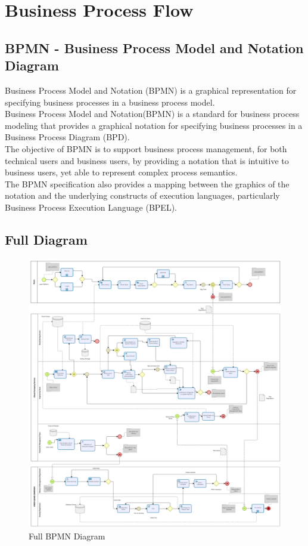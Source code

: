 \documentclass[a4paper,12pt]{report}
\begin{document}
\chapter{Business Process Flow}
\section{BPMN - Business Process Model and Notation Diagram }
Business Process Model and Notation (BPMN) is a graphical representation for specifying business processes in a business process model.\\
Business Process Model and Notation(BPMN) is a standard for business process modeling that provides a graphical notation for specifying business processes in a Business Process Diagram (BPD).\\
The objective of BPMN is to support business process management, for both technical users and business users, by providing a notation that is intuitive to business users, yet able to represent complex process semantics.\\
The BPMN specification also provides a mapping between the graphics of the notation and the underlying constructs of execution languages, particularly Business Process Execution Language (BPEL).
\section{Full Diagram}
\begin{figure}[H]
 \centering
\includegraphics[scale=0.15]{Full_BPMN}
\caption{Full BPMN Diagram}
\label{FULL BPMN}
\end{figure} 
%
%
\end{document}
